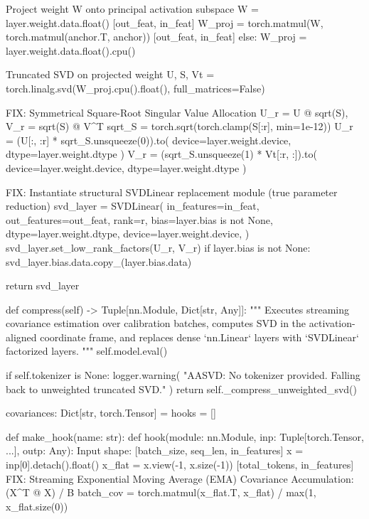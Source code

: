              Project weight W onto principal activation subspace
            W = layer.weight.data.float()   [out\_feat, in\_feat]
            W\_proj = torch.matmul(W, torch.matmul(anchor.T, anchor))   [out\_feat, in\_feat]
        else:
            W\_proj = layer.weight.data.float().cpu()

         Truncated SVD on projected weight
        U, S, Vt = torch.linalg.svd(W\_proj.cpu().float(), full\_matrices=False)

         FIX: Symmetrical Square-Root Singular Value Allocation U\_r = U @ sqrt(S), V\_r = sqrt(S) @ V^T
        sqrt\_S = torch.sqrt(torch.clamp(S[:r], min=1e-12))
        U\_r = (U[:, :r] * sqrt\_S.unsqueeze(0)).to(
            device=layer.weight.device, dtype=layer.weight.dtype
        )
        V\_r = (sqrt\_S.unsqueeze(1) * Vt[:r, :]).to(
            device=layer.weight.device, dtype=layer.weight.dtype
        )

         FIX: Instantiate structural SVDLinear replacement module (true parameter reduction)
        svd\_layer = SVDLinear(
            in\_features=in\_feat,
            out\_features=out\_feat,
            rank=r,
            bias=layer.bias is not None,
            dtype=layer.weight.dtype,
            device=layer.weight.device,
        )
        svd\_layer.set\_low\_rank\_factors(U\_r, V\_r)
        if layer.bias is not None:
            svd\_layer.bias.data.copy\_(layer.bias.data)

        return svd\_layer

    def compress(self) -> Tuple[nn.Module, Dict[str, Any]]:
        """
        Executes streaming covariance estimation over calibration batches,
        computes SVD in the activation-aligned coordinate frame, and replaces
        dense `nn.Linear` layers with `SVDLinear` factorized layers.
        """
        self.model.eval()

        if self.tokenizer is None:
            logger.warning(
                "AASVD: No tokenizer provided. Falling back to unweighted truncated SVD."
            )
            return self.\_compress\_unweighted\_svd()

        covariances: Dict[str, torch.Tensor] = {}
        hooks = []

        def make\_hook(name: str):
            def hook(module: nn.Module, inp: Tuple[torch.Tensor, ...], outp: Any):
                 Input shape: [batch\_size, seq\_len, in\_features]
                x = inp[0].detach().float()
                x\_flat = x.view(-1, x.size(-1))   [total\_tokens, in\_features]
                 FIX: Streaming Exponential Moving Average (EMA) Covariance Accumulation: (X^T @ X) / B
                batch\_cov = torch.matmul(x\_flat.T, x\_flat) / max(1, x\_flat.size(0))

